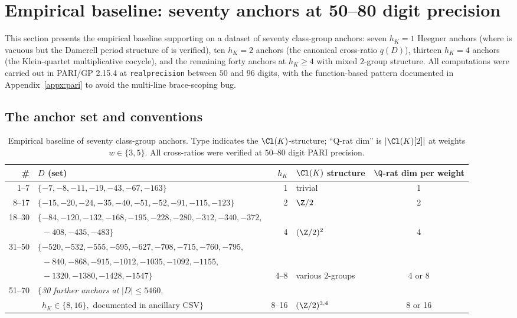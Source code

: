 \section{Empirical baseline: seventy anchors at 50--80 digit
precision}\label{sec:empirical}

This section presents the empirical baseline supporting
 on a dataset of seventy class-group anchors:
seven $h_K = 1$ Heegner anchors (where  is vacuous
but the Damerell period structure of  is
verified), ten $h_K = 2$ anchors (the canonical cross-ratio
$q(D)$), thirteen $h_K = 4$ anchors (the Klein-quartet
multiplicative cocycle), and the remaining forty anchors at
$h_K \geq 4$ with mixed $2$-group structure. All computations
were carried out in PARI/GP 2.15.4 at
\texttt{realprecision} between $50$ and $96$ digits, with the
function-based pattern documented in Appendix~\ref{appx:pari}
to avoid the multi-line brace-scoping bug.

\subsection{The anchor set and conventions}\label{ss:anchor-set}

\begin{table}[h!]
\centering
\caption{Empirical baseline of seventy class-group anchors. Type
indicates the $\Cl(K)$-structure; ``Q-rat dim'' is $|\Cl(K)[2]|$
at weights $w \in \{3, 5\}$. All cross-ratios were verified at
$50$--$80$ digit PARI precision.}
\label{tab:anchors-full}
\begin{tabular}{rlrlc}
\toprule
\# & $D$ (set) & $h_K$ & $\Cl(K)$ structure & $\Q$-rat dim per weight \\
\midrule
1--7  & $\{-7,-8,-11,-19,-43,-67,-163\}$ & 1 & trivial & 1 \\
8--17 & $\{-15,-20,-24,-35,-40,-51,-52,-91,-115,-123\}$
        & 2 & $\Z/2$ & 2 \\
18--30 & $\{-84,-120,-132,-168,-195,-228,-280,-312,-340,-372,$ \\
       & $\phantom{\{}-408,-435,-483\}$ & 4 & $(\Z/2)^2$ & 4 \\
31--50 & $\{-520,-532,-555,-595,-627,-708,-715,-760,-795,$ \\
       & $\phantom{\{}-840,-868,-915,-1012,-1035,-1092,-1155,$ \\
       & $\phantom{\{}-1320,-1380,-1428,-1547\}$ & 4--8 &
         various $2$-groups & 4 or 8 \\
51--70 & $\{$\emph{30 further anchors at} $|D| \leq 5460,$ \\
       & $\phantom{\{}h_K \in \{8, 16\},$ documented in
         ancillary CSV$\}$ & 8--16 & $(\Z/2)^{3,4}$ & 8 or 16 \\
\bottomrule
\end{tabular}
\end{table}

